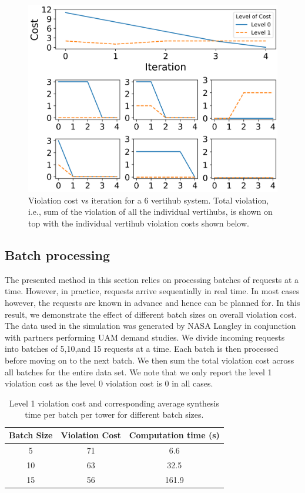 \begin{figure}[h!]
    \centering
    \includegraphics[width=0.85\columnwidth]{UAM-NFM/Figures/cost_vs_iteration_compiled.png}
    \caption{Violation cost vs iteration for a 6 vertihub system. Total violation, i.e., sum of the violation of all the individual vertihubs, is shown on top with the individual vertihub violation costs shown below.}
    \label{fig:costreduction}
\end{figure}



\subsection{Batch processing} The presented method in this section relies on processing batches of requests at a time. However, in practice, requests arrive sequentially in real time. In most cases however, the requests are known in advance and hence can be planned for. In this result, we demonstrate the effect of different batch sizes on overall violation cost. The data used in the simulation was generated by NASA Langley in conjunction with partners performing UAM demand studies. We divide incoming requests into batches of 5,10,and 15 requests at a time. Each batch is then processed before moving on to the next batch. We then sum the total violation cost across all batches for the entire data set. We note that we only report the level 1 violation cost as the level 0 violation cost is 0 in all cases. 

\begin{table}[]
\centering
\begin{tabular}{|c|c|c|} \toprule
Batch Size  & Violation Cost & Computation time (s) \\ \midrule
      5     &     71           &      6.6            \\
      10     &     63           &     32.5            \\
      15     &     56           &     161.9         \\ \bottomrule   
\end{tabular}
\caption{Level 1 violation cost and corresponding average synthesis time per batch per tower for different batch sizes.  } \label{tab:batchsizes}
\end{table}

